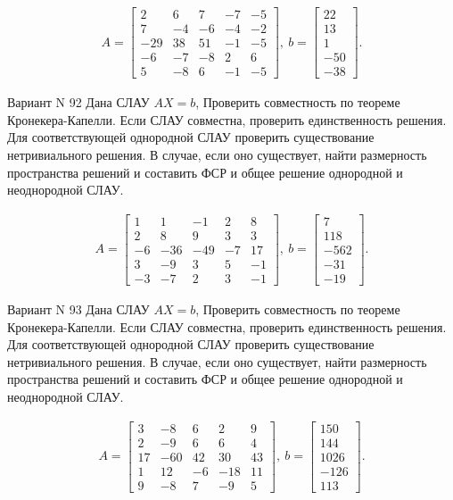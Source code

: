 \documentclass[11pt]{report}
\begin{document}
\begin{align*}
 A = \left[\begin{matrix}2 & 6 & 7 & -7 & -5\\7 & -4 & -6 & -4 & -2\\-29 & 38 & 51 & -1 & -5\\-6 & -7 & -8 & 2 & 6\\5 & -8 & 6 & -1 & -5\end{matrix}\right],
\ b = \left[\begin{matrix}22\\13\\1\\-50\\-38\end{matrix}\right]. 
 \end{align*}

Вариант N 92
Дана СЛАУ $AX = b$,
Проверить совместность по теореме Кронекера-Капелли. Если СЛАУ совместна, проверить единственность решения.
Для соответствующей однородной СЛАУ проверить существование нетривиального решения. В случае, если оно существует,
найти размерность пространства решений и составить ФСР и общее решение однородной  и неоднородной СЛАУ.


\begin{align*}
 A = \left[\begin{matrix}1 & 1 & -1 & 2 & 8\\2 & 8 & 9 & 3 & 3\\-6 & -36 & -49 & -7 & 17\\3 & -9 & 3 & 5 & -1\\-3 & -7 & 2 & 3 & -1\end{matrix}\right],
\ b = \left[\begin{matrix}7\\118\\-562\\-31\\-19\end{matrix}\right]. 
 \end{align*}

Вариант N 93
Дана СЛАУ $AX = b$,
Проверить совместность по теореме Кронекера-Капелли. Если СЛАУ совместна, проверить единственность решения.
Для соответствующей однородной СЛАУ проверить существование нетривиального решения. В случае, если оно существует,
найти размерность пространства решений и составить ФСР и общее решение однородной  и неоднородной СЛАУ.


\begin{align*}
 A = \left[\begin{matrix}3 & -8 & 6 & 2 & 9\\2 & -9 & 6 & 6 & 4\\17 & -60 & 42 & 30 & 43\\1 & 12 & -6 & -18 & 11\\9 & -8 & 7 & -9 & 5\end{matrix}\right],
\ b = \left[\begin{matrix}150\\144\\1026\\-126\\113\end{matrix}\right]. 
 \end{align*}
\end{document}
